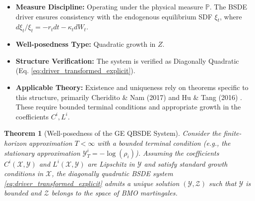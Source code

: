 \documentclass[11pt,letterpaper,oneside]{article}
\theoremstyle{plain}
\newtheorem{theorem}{Theorem}[section]
\theoremstyle{definition}
\theoremstyle{remark}
\begin{document}
\begin{tcolorbox}[colback=red!5!white, colframe=red!75!black, title={Hard Pre-Checks: QBSDE Gates Verified}]
\begin{itemize}
    \item \textbf{Measure Discipline:} Operating under the physical measure $\mathbb{P}$. The BSDE driver ensures consistency with the endogenous equilibrium SDF $\xi_t$, where $d\xi_t/\xi_t = -r_t dt - \kappa_t dW_t$.
    \item \textbf{Well-posedness Type:} Quadratic growth in $Z$.
    \item \textbf{Structure Verification:} The system is verified as Diagonally Quadratic (Eq. \ref{eq:driver_transformed_explicit}).
    \item \textbf{Applicable Theory:} Existence and uniqueness rely on theorems specific to this structure, primarily Cheridito \& Nam (2017) \cite{CheriditoNam2017} and Hu \& Tang (2016) \cite{HuTang2016}. These require bounded terminal conditions and appropriate growth in the coefficients $C^i, L^i$.
\end{itemize}
\end{tcolorbox}

\begin{theorem}[Well-posedness of the GE QBSDE System]
\label{thm:GE_QBSDE_Existence}
Consider the finite-horizon approximation $T<\infty$ with a bounded terminal condition (e.g., the stationary approximation $\mathcal{Y}_T^i = -\log(\rho_i)$). Assuming the coefficients $C^i(\mathcal{X}, \mathcal{Y})$ and $L^i(\mathcal{X}, \mathcal{Y})$ are Lipschitz in $\mathcal{Y}$ and satisfy standard growth conditions in $\mathcal{X}$, the diagonally quadratic BSDE system \eqref{eq:driver_transformed_explicit} admits a unique solution $(\mathcal{Y}, \mathcal{Z})$ such that $\mathcal{Y}$ is bounded and $\mathcal{Z}$ belongs to the space of BMO martingales.
\end{theorem}
\end{document}
